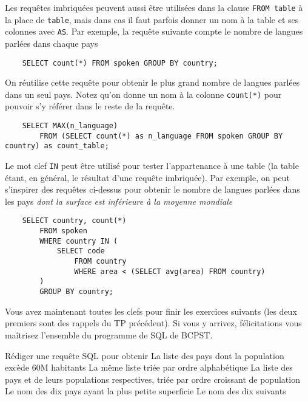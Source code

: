 Les requêtes imbriquées peuvent aussi être utilisées dans la clause \texttt{FROM table} à la place de \texttt{table}, mais dans cas il faut parfois donner un nom à la table et ses colonnes avec \texttt{AS}. Par exemple, la requête suivante compte le nombre de langues parlées dans chaque pays 

\begin{verbatim}
    SELECT count(*) FROM spoken GROUP BY country;
\end{verbatim}

On réutilise cette requête pour obtenir le plus grand nombre de langues parlées dans un seul pays. Notez qu'on donne un nom à la colonne \texttt{count(*)} pour pouvoir s'y référer dans le reste de la requête.

\begin{verbatim}
    SELECT MAX(n_language)
        FROM (SELECT count(*) as n_language FROM spoken GROUP BY country) as count_table;
\end{verbatim}

Le mot clef \texttt{IN} peut être utilisé pour tester l'appartenance à une table (la table étant, en général, le résultat d'une requête imbriquée). Par exemple, on peut s'inspirer des requêtes ci-dessus pour obtenir le nombre de langues parlées dans les pays \textit{dont la surface est inférieure à la moyenne mondiale} 

\begin{verbatim}
    SELECT country, count(*)
        FROM spoken
        WHERE country IN (
            SELECT code
                FROM country
                WHERE area < (SELECT avg(area) FROM country)
        )
        GROUP BY country;
\end{verbatim}

Vous avez maintenant toutes les clefs pour finir les exercices suivants (les deux premiers sont des rappels du TP précédent). Si vous y arrivez, félicitations vous maîtrisez l'ensemble du programme de SQL de BCPST.

\begin{enonce}
	Rédiger une requête SQL pour obtenir
	\ssques La liste des pays dont la population excède 60M habitants
	\ssques La même liste triée par ordre alphabétique
	\ssques La liste des pays et de leurs populations respectives, triée par ordre croissant de population
	\ssques Le nom des dix pays ayant la plus petite superficie
	\ssques Le nom des dix suivants
\end{enonce}

